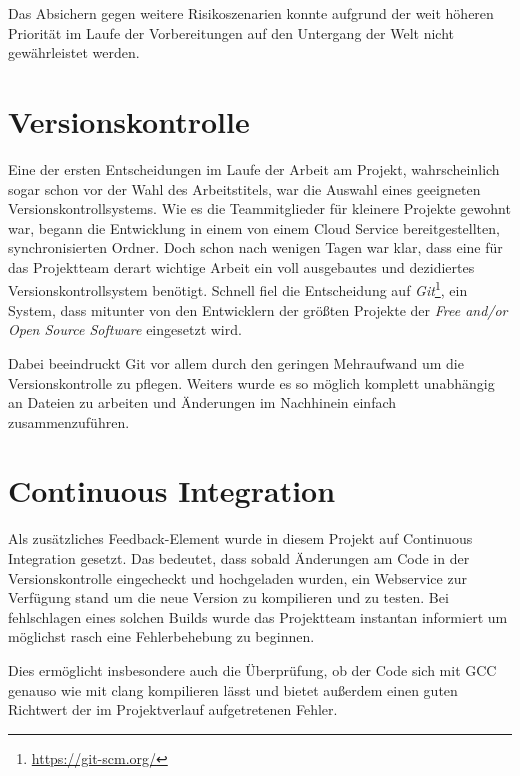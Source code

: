 Das Absichern gegen weitere Risikoszenarien konnte aufgrund der weit höheren Priorität im Laufe der Vorbereitungen auf den Untergang der Welt nicht gewährleistet werden.

\section{Versionskontrolle}
Eine der ersten Entscheidungen im Laufe der Arbeit am Projekt, wahrscheinlich sogar schon vor der Wahl des Arbeitstitels, war die Auswahl eines geeigneten Versionskontrollsystems. Wie es die Teammitglieder für kleinere Projekte gewohnt war, begann die Entwicklung in einem von einem Cloud Service bereitgestellten, synchronisierten Ordner. Doch schon nach wenigen Tagen war klar, dass eine für das Projektteam derart wichtige Arbeit ein voll ausgebautes und dezidiertes Versionskontrollsystem benötigt. Schnell fiel die Entscheidung auf \textit{Git}\footnote{\url{https://git-scm.org/}}, ein System, dass mitunter von den Entwicklern der größten Projekte der \textit{Free and/or Open Source Software} eingesetzt wird.

Dabei beeindruckt Git vor allem durch den geringen Mehraufwand um die Versionskontrolle zu pflegen. Weiters wurde es so möglich komplett unabhängig an Dateien zu arbeiten und Änderungen im Nachhinein einfach zusammenzuführen.

\section{Continuous Integration}
Als zusätzliches Feedback-Element wurde in diesem Projekt auf Continuous Integration gesetzt. Das bedeutet, dass sobald Änderungen am Code in der Versionskontrolle eingecheckt und hochgeladen wurden, ein Webservice zur Verfügung stand um die neue Version zu kompilieren und zu testen. Bei fehlschlagen eines solchen Builds wurde das Projektteam instantan informiert um möglichst rasch eine Fehlerbehebung zu beginnen.

Dies ermöglicht insbesondere auch die Überprüfung, ob der Code sich mit GCC genauso wie mit clang kompilieren lässt und bietet außerdem einen guten Richtwert der im Projektverlauf aufgetretenen Fehler. 
